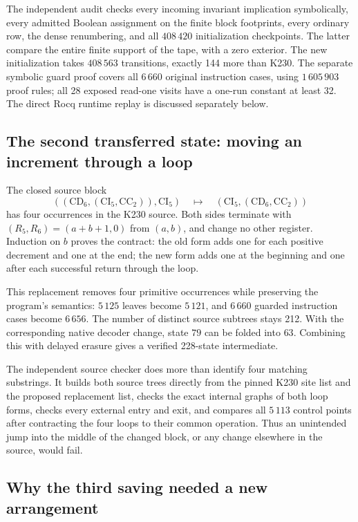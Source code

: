 The independent audit 
checks every incoming invariant implication symbolically, every admitted
Boolean assignment on the finite block footprints, every ordinary row,
the dense renumbering, and all $408\,420$ initialization checkpoints.
The latter compare the entire finite support of the tape, with a zero
exterior. The new initialization takes $408\,563$ transitions, exactly
144 more than K230. The separate symbolic guard proof covers all
$6\,660$ original instruction cases, using $1\,605\,903$ proof rules;
all 28 exposed read-one visits have a one-run constant at least 32.
The direct Rocq runtime replay is discussed separately below.

\subsection{The second transferred state: moving an increment through a loop}

The closed source block
\[
 ((\mathrm{CD}_6,(\mathrm{CI}_5,\mathrm{CC}_2)),\mathrm{CI}_5)
 \quad\longmapsto\quad
 (\mathrm{CI}_5,(\mathrm{CD}_6,\mathrm{CC}_2))
\]
has four occurrences in the K230 source. Both sides terminate with
\((R_5,R_6)=(a+b+1,0)\) from \((a,b)\), and change no other register.
Induction on $b$ proves the contract: the old form adds one for each
positive decrement and one at the end; the new form adds one at the
beginning and one after each successful return through the loop.

This replacement removes four primitive occurrences while preserving the
program's semantics: $5\,125$ leaves become $5\,121$, and $6\,660$ guarded
instruction cases become $6\,656$. The number of distinct source subtrees
stays 212. With the corresponding native decoder change, state $79$
can be folded into $63$. Combining this with delayed erasure gives a
verified 228-state intermediate.

The independent source checker does more than identify four matching
substrings. It builds both source trees directly from the pinned K230
site list and the proposed replacement list, checks the exact internal
graphs of both loop forms, checks every external entry and exit, and
compares all $5\,113$ control points after contracting the four loops
to their common operation. Thus an unintended jump into the middle of
the changed block, or any change elsewhere in the source, would fail.

\subsection{Why the third saving needed a new arrangement}

